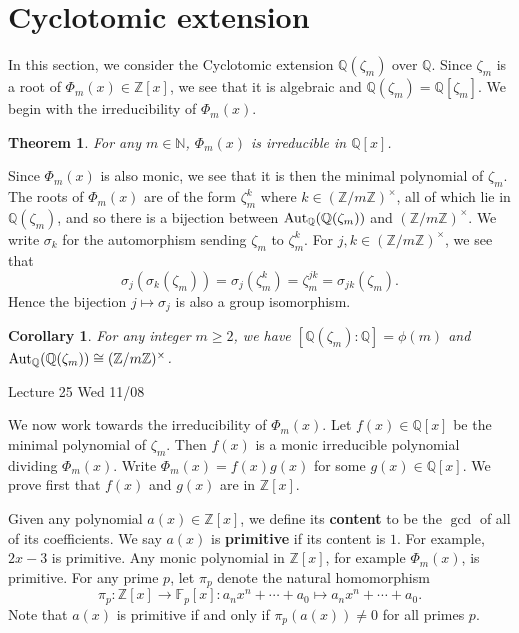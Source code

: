\documentclass{article}
\def\Z{{\mathbb Z}}
\def\Aut{{\rm Aut}}
\def\F{{\mathbb F}}
\def\N{{\mathbb N}}
\def\Q{{\mathbb Q}}
\def\Z{{\mathbb Z}}
\def\F{{\mathbb F}}
\def\Q{{\mathbb Q}}
\newtheorem{theorem}[subsection]{Theorem}
\newtheorem{cor}[subsection]{Corollary}
\newcommand{\add}[1]{{\color{blue} #1}}
\begin{document}
\section{Cyclotomic extension}
In this section, we consider the Cyclotomic extension $\Q(\zeta_m)$ over $\Q$. Since $\zeta_m$ is a root of $\Phi_m(x)\in\Z[x]$, we see that it is algebraic and $\Q(\zeta_m) = \Q[\zeta_m]$. We begin with the irreducibility of $\Phi_m(x)$.

\begin{theorem}
    For any $m\in\N$, $\Phi_m(x)$ is irreducible in $\Q[x]$.
\end{theorem}

Since $\Phi_m(x)$ is also monic, we see that it is then the minimal polynomial of $\zeta_m$. The roots of $\Phi_m(x)$ are of the form $\zeta_m^k$ where $k\in(\Z/m\Z)^\times$, all of which lie in $\Q(\zeta_m)$, and so there is a bijection between $\Aut_\Q(\Q(\zeta_m))$ and $(\Z/m\Z)^\times.$ We write $\sigma_k$ for the automorphism sending $\zeta_m$ to $\zeta_m^k$. For $j,k\in(\Z/m\Z)^\times$, we see that $$\sigma_j(\sigma_k(\zeta_m)) = \sigma_j(\zeta_m^k) = \zeta_m^{jk} = \sigma_{jk}(\zeta_m).$$
Hence the bijection $j\mapsto \sigma_j$ is also a group isomorphism.

\begin{cor}
    For any integer $m\geq 2$, we have $[\Q(\zeta_m):\Q] = \phi(m)$ and $\Aut_\Q(\Q(\zeta_m)) \cong (\Z/m\Z)^\times$.
\end{cor}

\begin{center}
    \add{Lecture 25 Wed 11/08}
\end{center}

We now work towards the irreducibility of $\Phi_m(x)$. Let $f(x)\in\Q[x]$ be the minimal polynomial of $\zeta_m$. Then $f(x)$ is a monic irreducible polynomial dividing $\Phi_m(x)$. Write $\Phi_m(x) = f(x)g(x)$ for some $g(x)\in\Q[x]$. We prove first that $f(x)$ and $g(x)$ are in $\Z[x]$.

Given any polynomial $a(x)\in\Z[x]$, we define its \textbf{content} to be the $\gcd$ of all of its coefficients. We say $a(x)$ is \textbf{primitive} if its content is $1$. For example, $2x - 3$ is primitive. Any monic polynomial in $\Z[x]$, for example $\Phi_m(x)$, is primitive. For any prime $p$, let $\pi_p$ denote the natural homomorphism $$\pi_p:\Z[x]\rightarrow\F_p[x]:a_nx^n + \cdots + a_0 \mapsto a_nx^n + \cdots + a_0.$$
Note that $a(x)$ is primitive if and only if $\pi_p(a(x))\neq 0$ for all primes $p$.
\end{document}
